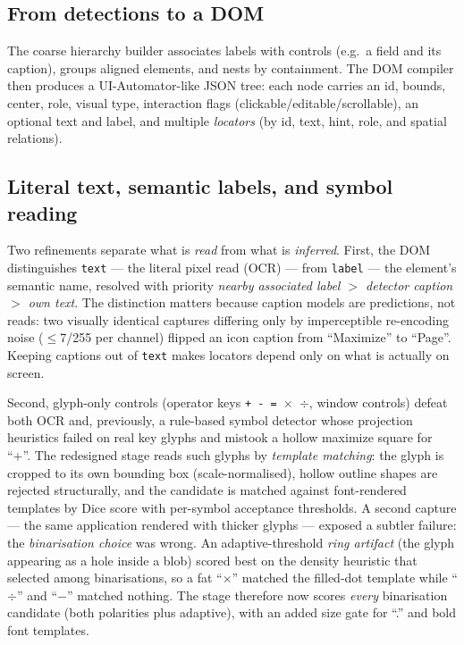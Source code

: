 \documentclass[11pt,a4paper]{article}
\newcommand{\code}[1]{\texttt{#1}}
\begin{document}
\subsection{From detections to a DOM}
The coarse hierarchy builder associates labels with controls (e.g.\ a field and its
caption), groups aligned elements, and nests by containment. The DOM compiler then
produces a UI-Automator-like JSON tree: each node carries an id, bounds, center,
role, visual type, interaction flags (clickable/editable/scrollable), an optional
text and label, and multiple \emph{locators} (by id, text, hint, role, and spatial
relations).

\subsection{Literal text, semantic labels, and symbol reading}
Two refinements separate what is \emph{read} from what is \emph{inferred}. First,
the DOM distinguishes \code{text} --- the literal pixel read (OCR) --- from
\code{label} --- the element's semantic name, resolved with priority \emph{nearby
associated label $>$ detector caption $>$ own text}. The distinction matters
because caption models are predictions, not reads: two visually identical captures
differing only by imperceptible re-encoding noise ($\leq$7/255 per channel) flipped
an icon caption from ``Maximize'' to ``Page''. Keeping captions out of \code{text}
makes locators depend only on what is actually on screen.

Second, glyph-only controls (operator keys \code{+ - = $\times$ $\div$}, window
controls) defeat both OCR and, previously, a rule-based symbol detector whose
projection heuristics failed on real key glyphs and mistook a hollow maximize
square for ``+''. The redesigned stage reads such glyphs by \emph{template
matching}: the glyph is cropped to its own bounding box (scale-normalised),
hollow outline shapes are rejected structurally, and the candidate is matched
against font-rendered templates by Dice score with per-symbol acceptance
thresholds. A second capture --- the same application rendered with thicker
glyphs --- exposed a subtler failure: the \emph{binarisation choice} was wrong.
An adaptive-threshold \emph{ring artifact} (the glyph appearing as a hole inside a
blob) scored best on the density heuristic that selected among binarisations, so a
fat ``$\times$'' matched the filled-dot template while ``$\div$'' and ``$-$''
matched nothing. The stage therefore now scores \emph{every} binarisation
candidate (both polarities plus adaptive), with an added size gate for ``.'' and
bold font templates.
\end{document}
